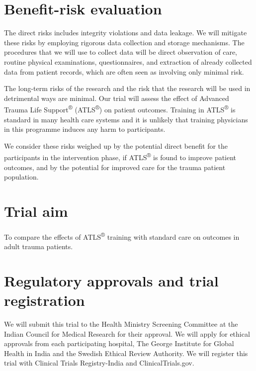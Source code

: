 \documentclass[
]{scrartcl}
\begin{document}
\hypertarget{benefit-risk-evaluation}{%
\section{Benefit-risk evaluation}\label{benefit-risk-evaluation}}

The direct risks includes integrity violations and data leakage. We will
mitigate these risks by employing rigorous data collection and storage
mechanisms. The procedures that we will use to collect data will be
direct observation of care, routine physical examinations,
questionnaires, and extraction of already collected data from patient
records, which are often seen as involving only minimal risk.

The long-term risks of the research and the risk that the research will
be used in detrimental ways are minimal. Our trial will assess the
effect of Advanced Trauma Life Support\textsuperscript{®}
(ATLS\textsuperscript{®}) on patient outcomes. Training in
ATLS\textsuperscript{®} is standard in many health care systems and it
is unlikely that training physicians in this programme induces any harm
to participants.

We consider these risks weighed up by the potential direct benefit for
the participants in the intervention phase, if ATLS\textsuperscript{®}
is found to improve patient outcomes, and by the potential for improved
care for the trauma patient population.

\hypertarget{trial-aim}{%
\section{Trial aim}\label{trial-aim}}

To compare the effects of ATLS\textsuperscript{®} training with standard
care on outcomes in adult trauma patients.

\hypertarget{regulatory-approvals-and-trial-registration}{%
\section{Regulatory approvals and trial
registration}\label{regulatory-approvals-and-trial-registration}}

We will submit this trial to the Health Ministry Screening Committee at
the Indian Council for Medical Research for their approval. We will
apply for ethical approvals from each participating hospital, The George
Institute for Global Health in India and the Swedish Ethical Review
Authority. We will register this trial with Clinical Trials
Registry-India and ClinicalTrials.gov.
\end{document}
